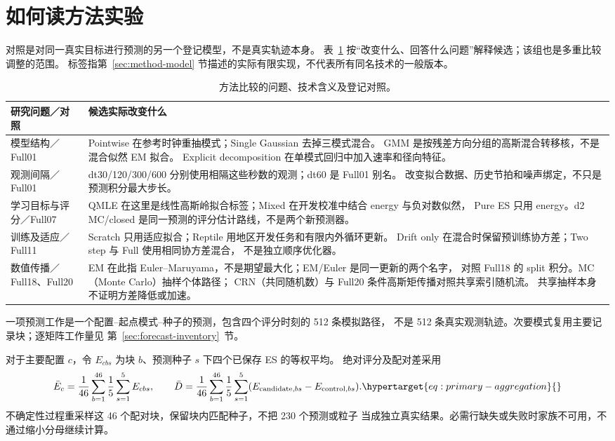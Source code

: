 \section{如何读方法实验}
\label{sec:method-reader}\hypertarget{sec:method-reader}{}
对照是对同一真实目标进行预测的另一个登记模型，不是真实轨迹本身。
表~\ref{tab:method-reader} 按“改变什么、回答什么问题”解释候选；该组也是多重比较调整的范围。
标签指第~\ref{sec:method-model} 节描述的实际有限实现，不代表所有同名技术的一般版本。

\begin{table}[htbp]
\centering\footnotesize
\caption{方法比较的问题、技术含义及登记对照。}
\label{tab:method-reader}\hypertarget{tab:method-reader}{}
\begin{tabular}{@{}p{.22\linewidth}p{.69\linewidth}@{}}
\toprule
研究问题／对照 & 候选实际改变什么\\
\midrule
模型结构／Full01 &
Pointwise 在参考时钟重抽模式；Single Gaussian 去掉三模式混合。
GMM 是按残差方向分组的高斯混合转移核，不是混合似然 EM 拟合。
Explicit decomposition 在单模式回归中加入速率和径向特征。\\
观测间隔／Full01 &
dt30/120/300/600 分别使用相隔这些秒数的观测；dt60 是 Full01 别名。
改变拟合数据、历史节拍和噪声绑定，不只是预测积分最大步长。\\
学习目标与评分／Full07 &
QMLE 在这里是线性高斯岭拟合标签；Mixed 在开发校准中结合 energy 与负对数似然，
Pure ES 只用 energy。d2 MC/closed 是同一预测的评分估计路线，不是两个新预测器。\\
训练及适应／Full11 &
Scratch 只用适应拟合；Reptile 用地区开发任务和有限内外循环更新。
Drift only 在混合时保留预训练协方差；Two step 与 Full 使用相同协方差混合，
不是独立顺序优化器。\\
数值传播／Full18、Full20 &
EM 在此指 Euler--Maruyama，不是期望最大化；EM/Euler 是同一更新的两个名字，
对照 Full18 的 split 积分。MC（Monte Carlo）抽样个体路径；
CRN（共同随机数）与 Full20 条件高斯矩传播对照共享索引随机流。
共享抽样本身不证明方差降低或加速。\\
\bottomrule
\end{tabular}
\end{table}

一项预测工作是一个配置--起点模式--种子的预测，包含四个评分时刻的 512 条模拟路径，
不是 512 条真实观测轨迹。次要模式复用主要记录块；逐矩阵工作量见
第~\ref{sec:forecast-inventory}~节。

对于主要配置 $c$，令 $E_{cbs}$ 为块 $b$、预测种子 $s$ 下四个已保存 ES 的等权平均。
绝对评分及配对差采用
\begin{equation}
\bar E_c=\frac{1}{46}\sum_{b=1}^{46}\frac{1}{5}\sum_{s=1}^{5}E_{cbs},
\qquad
\bar D=\frac{1}{46}\sum_{b=1}^{46}\frac{1}{5}\sum_{s=1}^{5}
(E_{\mathrm{candidate},bs}-E_{\mathrm{control},bs}).
\label{eq:primary-aggregation}\hypertarget{eq:primary-aggregation}{}
\end{equation}
不确定性过程重采样这 46 个配对块，保留块内匹配种子，不把 230 个预测或粒子
当成独立真实结果。必需行缺失或失败时家族不可用，不通过缩小分母继续计算。

